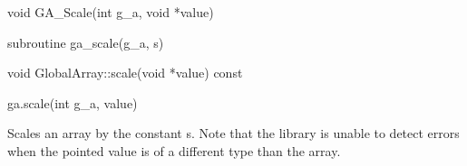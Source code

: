 \documentclass[10pt]{article}
\begin{document}

\begin{capi}
\begin{ccode}
void GA_Scale(int g_a, void *value)
\end{ccode}
\begin{funcargs}
\end{funcargs}
\end{capi}

\begin{fapi}
\begin{fcode}
subroutine ga_scale(g_a, s)
\end{fcode}
\begin{funcargs}
\end{funcargs}
\end{fapi}

\begin{cxxapi}
\begin{cxxcode}
void GlobalArray::scale(void *value) const
\end{cxxcode}
\begin{funcargs}
\end{funcargs}
\end{cxxapi}

\begin{pyapi}
\begin{pycode}
ga.scale(int g_a, value)
\end{pycode}
\begin{funcargs}
\end{funcargs}
\end{pyapi}

\gcoll

\begin{desc}

Scales an array by the constant s. Note that the library is unable to detect
errors when the pointed value is of a different type than the array.

\end{desc}

\end{document}
